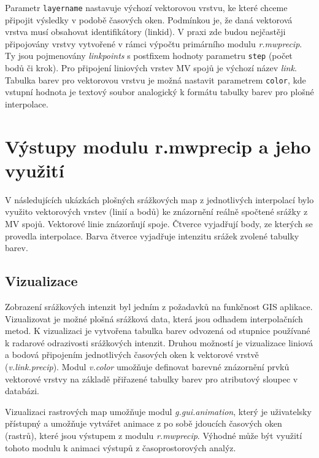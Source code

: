 \documentclass[a4paper,12pt,oneside]{report}
\begin{document}
Parametr \texttt{layername} nastavuje výchozí vektorovou vrstvu, ke
které chceme při\-pojit výsledky v podobě časových oken. Podmínkou je,
že daná vektorová vrstva musí obsahovat identifikátory (linkid). V
praxi zde budou nejčastěji připojovány vrstvy vytvořené v rámci
výpočtu primárního modulu \textit{r.mwprecip}. Ty jsou pojmenovány
\textit{linkpoints} s postfixem hodnoty parametru \texttt{step} (počet
bodů či krok). Pro připojení liniových vrstev MV spojů je výchozí
název \textit{link}.  Tabulka barev pro vektorovou vrstvu je možná
nastavit parametrem \texttt{color}, kde vstupní hodnota je textový
soubor analogický k formátu tabulky barev pro plošné interpolace.




\newpage
\setcounter{footnote}{1}
\section{Výstupy modulu r.mwprecip a jeho využití}

V následujících ukázkách plošných srážkových map z jednotlivých
interpolací bylo využito vektorových vrstev (linií a bodů) ke
znázornění reálně spočtené srážky z MV spojů. Vektorové linie
znázorňují spoje. Čtverce vyjadřují body, ze kterých se provedla
interpolace. Barva čtverce vyjadřuje intenzitu srážek zvolené tabulky
barev.


\subsection{Vizualizace}
Zobrazení srážkových intenzit byl jedním z požadavků na funkčnost GIS
aplikace. Vizualizovat je možné plošná srážková data, která jsou odhadem
interpolačních metod. K vizualizaci je vytvořena tabulka barev
odvozená od stupnice používané k radarové odrazivosti srážkových
intenzit. Druhou možností je vizualizace liniová a bodová připojením
jednotlivých časových oken k vektorové vrstvě
(\textit{v.link.precip}). Modul \textit{v.color} umožňuje definovat
barevné znázornění prvků vektorové vrstvy na základě přiřazené tabulky
barev pro atributový sloupec v databázi.

Vizualizaci rastrových map umožňuje modul \textit{g.gui.animation}, který je
 uživatelsky přístupný a umožňuje vytvářet animace z
po sobě jdoucích časových oken (rastrů), které jsou výstupem z modulu \textit{r.mwprecip}. 
Výhodné může být využití tohoto modulu k animaci výstupů z časoprostorových analýz.
\end{document}
